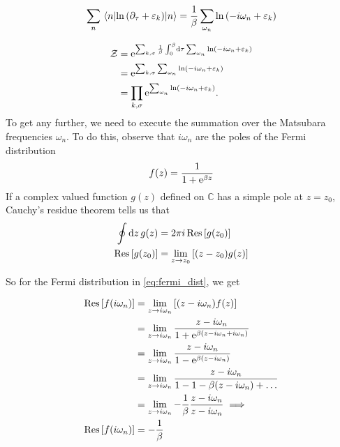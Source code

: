 \begin{equation}
\sum_n\ev{\ln\left(\partial_\tau + \varepsilon_k\right)}{n} = \frac{1}{\beta}\sum_{\omega_n}\ln\left(-i\omega_n + \varepsilon_k\right)
\end{equation}

\begin{align}
\label{eq:_electron}
\begin{split}
\mathcal{Z} &= \mathrm{e}^{\sum_{k,\sigma}\frac{1}{\beta}\int_0^\beta\dd{\tau}\sum_{\omega_n}\ln\left(-i\omega_n + \varepsilon_k\right)} \\
&= \mathrm{e}^{\sum_{k,\sigma}\sum_{\omega_n}\ln\left(-i\omega_n + \varepsilon_k\right)} \\
&= \prod_{k,\sigma}\mathrm{e}^{\sum_{\omega_n}\ln\left(-i\omega_n + \varepsilon_k\right)}.
\end{split}
\end{align}
To get any further, we need to execute the summation over the Matsubara frequencies $\omega_n$. To do this, observe that $i\omega_n$ are the poles of the Fermi distribution
\begin{equation}
\label{eq:fermi_dist}
f(z) = \frac{1}{1+\mathrm{e}^{\beta z}}
\end{equation}
If a complex valued function $g(z)$ defined on $\mathbb{C}$ has a simple pole at $z = z_0$, Cauchy's residue theorem tells us that 
\begin{align}
\oint\dd{z}g(z) &= 2\pi i\Res\left[g(z_0)\right] \\
\Res\left[g(z_0)\right]&= \lim_{z\rightarrow z_0}\left[(z-z_0)g(z)\right]
\end{align}

So for the Fermi distribution in \eqref{eq:fermi_dist}, we get

\begin{align}
\Res\left[f(i\omega_n)\right] &= \lim_{z\rightarrow i\omega_n}\left[(z-i\omega_n)f(z)\right] \nonumber \\
&= \lim_{z\rightarrow i\omega_n}\frac{z-i\omega_n}{1+\e^{\beta(z-i\omega_n + i\omega_n)}} \nonumber \\
&= \lim_{z\rightarrow i\omega_n} \frac{z-i\omega_n}{1-\e^{\beta(z-i\omega_n)}} \nonumber \\
&=\lim_{z\rightarrow i\omega_n} \frac{z-i\omega_n}{1-1-\beta(z-i\omega_n)+\dots} \nonumber \\
&=\lim_{z\rightarrow i\omega_n} -\frac{1}{\beta}\frac{z-i\omega_n}{z-i\omega_n} \implies \nonumber \\
\Res\left[f(i\omega_n)\right] &= -\frac{1}{\beta}
\end{align}

